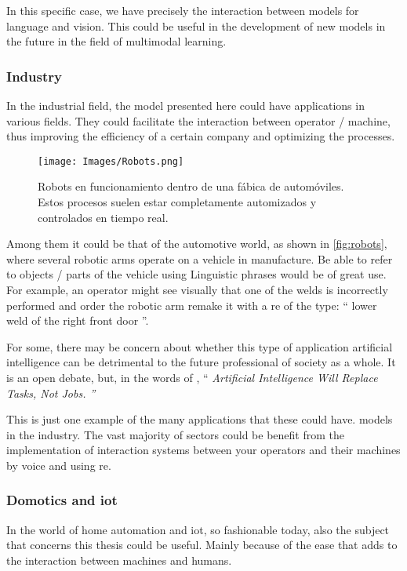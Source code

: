 In this specific case, we have precisely the interaction between models for
language and vision. This could be useful in the development of new models
in the future in the field of multimodal learning.

\subsubsection{Industry}
In the industrial field, the model presented here could have applications in
various fields. They could facilitate the interaction between operator / machine,
thus improving the efficiency of a certain company and optimizing the
processes.

\begin{figure}[ht]
  \centering
  \texttt{[image: Images/Robots.png]}
  \caption[Robots en fábrica de automóviles]{Robots en funcionamiento dentro de
    una fábica de automóviles. Estos procesos suelen estar completamente
    automizados y controlados en tiempo real.}
  \label{fig:robots}
\end{figure}

Among them it could be that of the automotive world, as
shown in \vref{fig:robots}, where several robotic arms operate on a
vehicle in manufacture. Be able to refer to objects / parts of the vehicle using
Linguistic phrases would be of great use. For example, an operator might see
visually that one of the welds is incorrectly performed and order the
robotic arm remake it with a \gls{re} of the type: `` lower weld of the
right front door ''.

\begin{remarkBox}
  For some, there may be concern about whether this type of application
  artificial intelligence can be detrimental to the future professional
  of society as a whole. It is an open debate, but, in the words of
  \citeauthor *{contributor18: artif_intel_will_replac_tasks_not_jobs}
  \cite{contributor18:artif_intel_will_replac_tasks_not_jobs}, `` \itshape
  Artificial Intelligence Will Replace Tasks, Not Jobs. ''
\end{remarkBox}

This is just one example of the many applications that these could have.
models in the industry. The vast majority of sectors could be
benefit from the implementation of interaction systems between your operators
and their machines by voice and using \gls{re}.

\subsubsection{Domotics and \acs *{iot}}
In the world of home automation and \gls{iot}, so fashionable today, also
the subject that concerns this thesis could be useful. Mainly because of the
ease that adds to the interaction between machines and humans.

